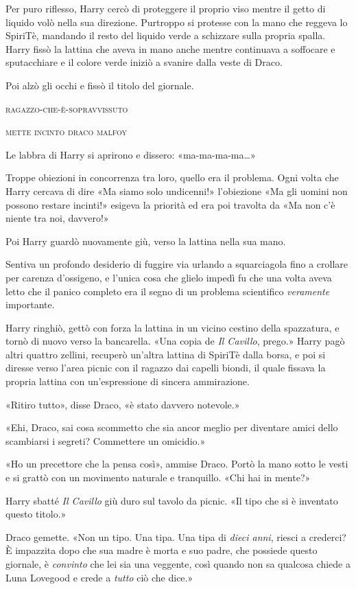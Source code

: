 Per puro riflesso, Harry cercò di proteggere il proprio viso mentre il getto di liquido volò nella sua direzione. Purtroppo si protesse con la mano che reggeva lo SpiriTè, mandando il resto del liquido verde a schizzare sulla propria spalla.
Harry fissò la lattina che aveva in mano anche mentre continuava a soffocare e sputacchiare e il colore verde iniziò a svanire dalla veste di Draco.


Poi alzò gli occhi e fissò il titolo del giornale.

\textsc{ragazzo-che-è-sopravvissuto}

\textsc{mette incinto draco malfoy}

Le labbra di Harry si aprirono e dissero: «ma-ma-ma-ma…»

Troppe obiezioni in concorrenza tra loro, quello era il problema. Ogni volta che Harry cercava di dire «Ma siamo solo undicenni!» l’obiezione «Ma gli uomini non possono restare incinti!» esigeva la priorità ed era poi travolta da «Ma non c’è niente tra noi, davvero!»

Poi Harry guardò nuovamente giù, verso la lattina nella sua mano.

Sentiva un profondo desiderio di fuggire via urlando a squarciagola fino a crollare per carenza d’ossigeno, e l’unica cosa che glielo impedì fu che una volta aveva letto che il panico completo era il segno di un problema scientifico \textit{veramente} importante.

Harry ringhiò, gettò con forza la lattina in un vicino cestino della spazzatura, e tornò di nuovo verso la bancarella. «Una copia de \textit{Il Cavillo}, prego.» Harry pagò altri quattro zellini, recuperò un’altra lattina di SpiriTè dalla borsa, e poi si diresse verso l’area picnic con il ragazzo dai capelli biondi, il quale fissava la propria lattina con un’espressione di sincera ammirazione.

«Ritiro tutto», disse Draco, «è stato davvero notevole.»

«Ehi, Draco, sai cosa scommetto che sia ancor meglio per diventare amici dello scambiarsi i segreti? Commettere un omicidio.»

«Ho un precettore che la pensa così», ammise Draco. Portò la mano sotto le vesti e si grattò con un movimento naturale e tranquillo. «Chi hai in mente?»

Harry sbatté \textit{Il Cavillo} giù duro sul tavolo da picnic. «Il tipo che si è inventato questo titolo.»

Draco gemette. «Non un tipo. Una tipa. Una tipa di \textit{dieci anni}, riesci a crederci? È impazzita dopo che sua madre è morta e suo padre, che possiede questo giornale, è \textit{convinto} che lei sia una veggente, così quando non sa qualcosa chiede a Luna Lovegood e crede a \textit{tutto} ciò che dice.»


